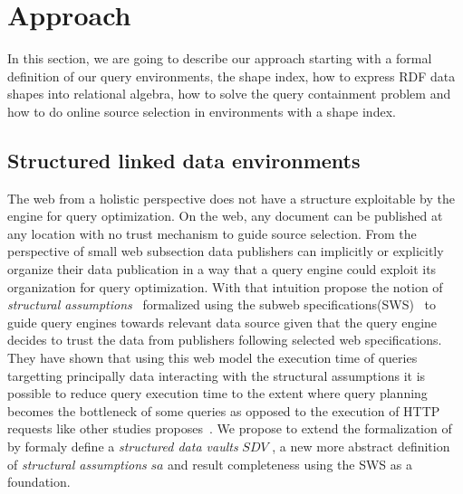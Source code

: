 \section{Approach}



In this section, we are going to describe our approach starting with a formal definition of our query environments,
the shape index, how to express RDF data shapes into relational algebra, how to solve the query containment problem
and how to do online source selection in environments with a shape index.

\subsection{Structured linked data environments}
The web from a holistic perspective does not have a structure exploitable by the engine for query optimization.
On the web, any document can be published at any location with no trust mechanism to guide source selection.
From the perspective of small web subsection data publishers can implicitly or explicitly organize their data publication in a way that a query engine could exploit 
its organization for query optimization.
With that intuition \citeauthor{Taelman2023} propose the notion of \emph{structural assumptions}~\cite{Taelman2023} formalized using the subweb specifications(SWS)~\cite{Bogaerts2021LinkTW}
to guide query engines towards relevant data source given that the query engine decides to trust the data from publishers following selected web specifications.
They have shown that using this web model the execution time of queries targetting principally data interacting with the structural assumptions it is possible to 
reduce query execution time to the extent where query planning becomes the bottleneck of some queries as opposed to the execution of HTTP requests like other studies proposes~\cite{Taelman2023, hartig2016walking}.
We propose to extend the formalization of \citeauthor{Taelman2023} by formaly define a \emph{structured data vaults} $SDV$ , a new more abstract definition of \emph{structural assumptions} $sa$ and result completeness 
using the SWS as a foundation.

